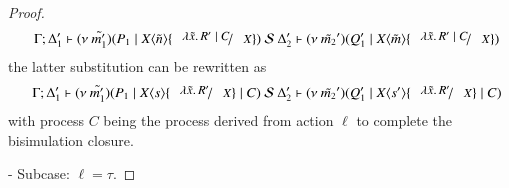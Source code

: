 \begin{proof}
	\begin{eqnarray*}
		&& \horel{\Gamma}
		{\Delta_1'}{\newsp{\tilde{m_1'}}{P_1 \Par \appl{X}{\tilde{n}} \subst{\abs{\tilde{x}}{R' \Par C}}{X}}}
		{\ \mathcal{S}\ }
		{\Delta_2'}{\newsp{\tilde{m_2}'}{Q_1' \Par \appl{X}{\tilde{m}} \subst{\abs{\tilde{x}}{R' \Par C}}{X}}}
	\end{eqnarray*}
%
	\noi the latter substitution can be rewritten as
%
	\begin{eqnarray*}
		&&\horel{\Gamma}
		{\Delta_1'}{\newsp{\tilde{m_1'}}{P_1 \Par \appl{X}{s} \subst{\abs{\tilde{x}}{R'}}{X} \Par C}}
		{\ \mathcal{S}\ }
		{\Delta_2'}{\newsp{\tilde{m_2}'}{Q_1' \Par \appl{X}{s'} \subst{\abs{\tilde{x}}{R'}}{X} \Par C}}
	\end{eqnarray*}
%
	\noi with process $C$ being the process derived from action $\ell$
	to complete the bisimulation closure.

	\noi - Subcase: $\ell = \tau$.


\end{proof}
